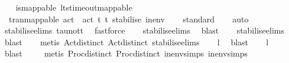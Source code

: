 \begin{isabellebody}
%
\isadelimunimportant
%
\endisadelimunimportant
%
\isatagunimportant
%
\endisatagunimportant
{\isafoldunimportant}%
%
\isadelimunimportant
\ \ \isanewline
%
\endisadelimunimportant
{}\isamarkupfalse%
\ is{\isacharunderscore}{\kern0pt}mappable{\isacharcolon}{\kern0pt}\ {\isacartoucheopen}lts{\isacharunderscore}{\kern0pt}timeout{\isacharunderscore}{\kern0pt}mappable\ \isanewline
\ \ tran{\isacharunderscore}{\kern0pt}mappable\ {\isacharparenleft}{\kern0pt}act\ {\isasymtau}{\isacharparenright}{\kern0pt}\ {\isacharparenleft}{\kern0pt}act\ t{\isacharparenright}{\kern0pt}\ t{\isacharunderscore}{\kern0pt}{\isasymepsilon}\ stabilise\ in{\isacharunderscore}{\kern0pt}env{\isacartoucheclose}\isanewline
%
\isadelimproof
\ \ %
\endisadelimproof
%
\isatagproof
{}\isamarkupfalse%
\ standard\isanewline
\ \ \isamarkupfalse%
\ auto\ \isanewline
\ \ \isamarkupfalse%
\ stabilise{\isachardot}{\kern0pt}elims\ tau{\isacharunderscore}{\kern0pt}not{\isacharunderscore}{\kern0pt}t\ \isamarkupfalse%
\ fastforce\isanewline
\ \ \isamarkupfalse%
\ stabilise{\isachardot}{\kern0pt}elims\ \isamarkupfalse%
\ blast\isanewline
\ \ \isamarkupfalse%
\ stabilise{\isachardot}{\kern0pt}elims\ \isamarkupfalse%
\ blast\isanewline
\ \ \isamarkupfalse%
\ {\isacharparenleft}{\kern0pt}metis\ Act{\isacharunderscore}{\kern0pt}{\isasymtheta}{\isachardot}{\kern0pt}distinct{\isacharparenleft}{\kern0pt}{}{\isacharparenright}{\kern0pt}\ Act{\isacharunderscore}{\kern0pt}{\isasymtheta}{\isachardot}{\kern0pt}distinct{\isacharparenleft}{\kern0pt}{}{\isacharparenright}{\kern0pt}\ stabilise{\isachardot}{\kern0pt}elims{\isacharparenright}{\kern0pt}\isanewline
\ \ \isamarkupfalse%
\ l{}\ \isamarkupfalse%
\ blast\isanewline
\ \ \isamarkupfalse%
\ l{}\ \isamarkupfalse%
\ blast\ \isanewline
\ \ \isamarkupfalse%
\ {\isacharparenleft}{\kern0pt}metis\ Proc{\isacharunderscore}{\kern0pt}{\isasymtheta}{\isachardot}{\kern0pt}distinct{\isacharparenleft}{\kern0pt}{}{\isacharparenright}{\kern0pt}\ Proc{\isacharunderscore}{\kern0pt}{\isasymtheta}{\isachardot}{\kern0pt}distinct{\isacharparenleft}{\kern0pt}{}{\isacharparenright}{\kern0pt}\ in{\isacharunderscore}{\kern0pt}env{\isachardot}{\kern0pt}simps{\isacharparenleft}{\kern0pt}{}{\isacharparenright}{\kern0pt}\ in{\isacharunderscore}{\kern0pt}env{\isachardot}{\kern0pt}simps{\isacharparenleft}{\kern0pt}{}{\isacharparenright}{\kern0pt}{\isacharparenright}{\kern0pt}\isanewline

\end{isabellebody}
